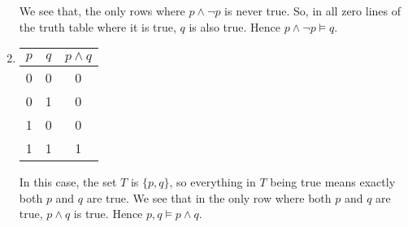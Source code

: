 \documentclass[11pt]{article}
\begin{document}
\begin{answer}
\begin{enumerate}
\begin{minipage}{0.5\textwidth}
            We see that, the only rows where $p \land \neg p$ is never true. So, in all zero lines of the truth table where it is true, $q$ is also true. Hence $p \land \neg p \vDash q$.
        \end{minipage}
        \item 
        \begin{tabular}{|c|c|c|}
            \hline
            \cellcolor{blue!40}$p$ & \cellcolor{blue!40}$q$ & \cellcolor{yellow!40}$p \land q$\\
            \hline \hline
            0 & 0 & 0 \\
            0 & 1 & 0 \\
            1 & 0 & 0 \\
            \rowcolor{green!40}1 & 1 & 1 \\
            \hline
        \end{tabular} 
        \quad 
        \begin{minipage}{0.5\textwidth}
            In this case, the set $T$ is $\{p,q\}$, so everything in $T$ being true means exactly both $p$ and $q$ are true. We see that in the only row where both $p$ and $q$ are true, $p \land q$ is true. Hence $p,q \vDash p \land q$.
        \end{minipage}
    \end{enumerate}
\end{answer}

\printindex
\end{document}
